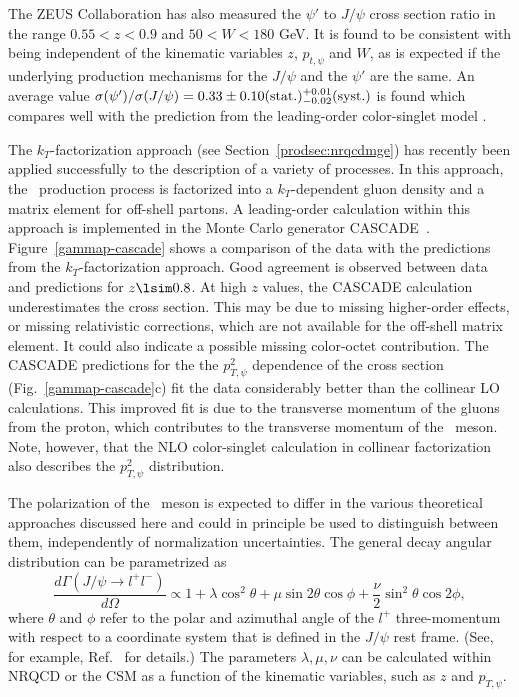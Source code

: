 The ZEUS Collaboration has also measured the $\psi'$ to $J/\psi$ cross
section ratio \cite{Chekanov:2002at} in the range $0.55 < z < 0.9$ and
$50 < W < 180$ GeV. It is found to be consistent with being
independent of the kinematic variables $z$, $p_{t,\psi}$ and $W$, as
is expected if the underlying production mechanisms for the $J/\psi$
and the $\psi'$ are the same.
An average value $\sigma(\psi')/\sigma(J/\psi)=
0.33\pm0.10 ({\rm stat.}) ^{+0.01}_{-0.02} ({\rm syst.})$ is found
which compares well with the prediction from the leading-order
color-singlet model \cite{Kramer:1994zi}.


The $k_T$-factorization approach %
(see Section~\ref{prodsec:nrqcdmge}) has recently been applied
successfully to the description of a variety of
processes\cite{Jung:2001hk,Jung:2001hx,Saleev:1994fg}. In this approach,
the \jpsi\ production process is factorized into a $k_T$-dependent gluon
density and a matrix element for off-shell partons. A leading-order
calculation within this approach is implemented in the Monte Carlo
generator CASCADE~\cite{Jung:2001hk,Jung:2001hx}.
Figure~\ref{gammap-cascade} shows a comparison of the data with the
predictions from the $k_T$-factorization approach. Good agreement is
observed between data and predictions for $z\lsim 0.8$. At high $z$
values, the CASCADE calculation underestimates the cross section. This
may be due to missing higher-order effects, or missing relativistic
corrections, which are not available for the off-shell matrix element.
It could also indicate a possible missing color-octet contribution.  The
CASCADE predictions for the the \ensuremath{p_{T,\psi}^2} dependence of
the cross section (Fig.~\ref{gammap-cascade}c) fit the data considerably
better than the collinear LO calculations. This improved fit is due to
the transverse momentum of the gluons from the proton, which contributes
to the transverse momentum of the \jpsi\ meson. Note, however, that the
NLO color-singlet calculation in collinear factorization
\cite{Kramer:1995nb} also describes the \ensuremath{p_{T,\psi}^2}
distribution.

The polarization of the \jpsi\ meson is expected to differ in the
various theoretical approaches discussed here and could in principle
be used to distinguish between them, independently of normalization
uncertainties. The general decay angular distribution can be
parametrized as
\begin{equation}
  \frac{d\Gamma(J/\psi\to l^+l^-)}{d\Omega}
  \propto
  1 + \lambda \cos^2\theta + \mu \sin 2\theta \cos\phi
  + \frac{\nu}{2} \sin^2\theta \cos 2\phi,
  \label{paramdef}
\end{equation}
where $\theta$ and $\phi$ refer to the polar and azimuthal angle of the
$l^+$ three-momentum with respect to a coordinate system that is defined
in the $J/\psi$ rest frame. (See, for example, Ref.~\cite{Beneke:1998re}
for details.) The parameters $\lambda, \mu, \nu$ can be calculated
within NRQCD or the CSM as a function of the kinematic variables, 
such as $z$ and $p_{T,\psi}$.

